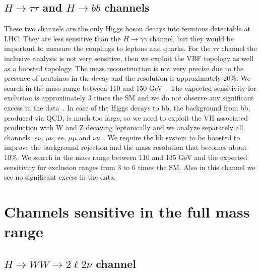 \documentclass{cimento}
\begin{document}
%
%

\subsection{$H \to \tau\tau$ and $H \to bb$ channels}

These two channels are the only Higgs boson decays into fermions
detectable at LHC.  They are less sensitive than the
$H \to \gamma\gamma$ channel, but they would be important to measure
the couplings to leptons and quarks.
%
For the $\tau\tau$ channel the inclusive analysis is not very
sensitive, then we exploit the VBF topology as well as a boosted
topology. The mass reconstruction is not very precise due to the
presence of neutrinos in the decay and the resolution is approximately
20\%.  We search in the mass range between 110 and 150
GeV~\cite{Chatrchyan:2012vp}. The expected sensitivity for exclusion
is approximately 3 times the SM and we do not observe any significant
excess in the data~\cite{HIG-12-007,HIG-12-006}.
%
In case of the Higgs decays to bb, the background from bb, produced
via QCD, is much too large, so we need to exploit the VH associated
production with W and Z decaying leptonically and we analyze
separately all channels: $e\nu$, $\mu\nu$, ee, $\mu\mu$ and
$\nu\nu$~\cite{Chatrchyan:2012ww}.  We require the bb system to be
boosted to improve the background rejection and the mass resolution
that becomes about 10\%.  We search in the mass range between 110 and
135 GeV and the expected sensitivity for exclusion ranges from 3 to 6
times the SM.  Also in this channel we see no significant excess in
the data.



\section{Channels sensitive in the full mass range}

%
%

\subsection{$H \to WW \to 2\ell 2\nu$ channel}
\end{document}
